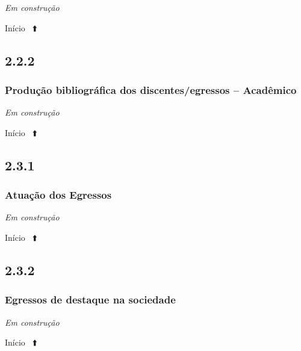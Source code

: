 \documentclass[
  a4paper,
]{book}
\begin{document}
\emph{Em construção}

Início ~⬆️

\hypertarget{section-14}{%
\subsection{\texorpdfstring{\textbf{2.2.2}}{2.2.2}}\label{section-14}}

\hypertarget{produuxe7uxe3o-bibliogruxe1fica-dos-discentesegressos-acaduxeamico}{%
\subsubsection{\texorpdfstring{\textbf{Produção bibliográfica dos discentes/egressos -- Acadêmico}}{Produção bibliográfica dos discentes/egressos -- Acadêmico}}\label{produuxe7uxe3o-bibliogruxe1fica-dos-discentesegressos-acaduxeamico}}

\emph{Em construção}

Início ~⬆️

\hypertarget{section-15}{%
\subsection{\texorpdfstring{\textbf{2.3.1}}{2.3.1}}\label{section-15}}

\hypertarget{atuauxe7uxe3o-dos-egressos}{%
\subsubsection{\texorpdfstring{\textbf{Atuação dos Egressos}}{Atuação dos Egressos}}\label{atuauxe7uxe3o-dos-egressos}}

\emph{Em construção}

Início ~⬆️

\hypertarget{section-16}{%
\subsection{\texorpdfstring{\textbf{2.3.2}}{2.3.2}}\label{section-16}}

\hypertarget{egressos-de-destaque-na-sociedade}{%
\subsubsection{\texorpdfstring{\textbf{Egressos de destaque na sociedade}}{Egressos de destaque na sociedade}}\label{egressos-de-destaque-na-sociedade}}

\emph{Em construção}

Início ~⬆️
\end{document}

